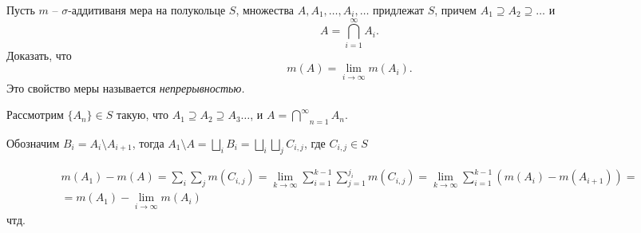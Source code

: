 \begin{task}{4}
Пусть $m$ -- $\sigma$-аддитиваня мера на полукольце $S$, множества $A, A_1, \ldots, A_i, \ldots$ придлежат $S$, причем $A_1 \supseteq A_2 \supseteq \ldots$ и
\[
A = \bigcap_{i = 1}^{\infty}A_i.
\]
Доказать, что
\[
m(A) = \lim\limits_{i \to \infty}m(A_i).
\]
Это свойство меры называется \textit{непрерывностью.}
\end{task}
\begin{solution}
Рассмотрим $\lbrace A_n \rbrace \in S$ такую,  что $A_1 \supseteq A_2 \supseteq A_3 \ldots$, и $A = \underset{n=1}{\overset{\infty}{\bigcap}} A_n$.

Обозначим $B_i = A_i \setminus A_{i+1}$, тогда $A_1 \setminus A = 
\bigsqcup\limits_i B_i = \bigsqcup\limits_i \bigsqcup\limits_j C_{i, j}$, где 
$C_{i, j} \in S$

\begin{gather*}
m(A_1) - m(A) = \sum_i \sum_j m(C_{i, j}) = 
\lim_{k \to \infty} \sum_{i=1}^{k-1} \sum_{j = 1}^{j_i} m(C_{i,j}) = \lim_{k 
\to \infty} \sum\limits_{i=1}^{k-1} \left( m(A_i) - m(A_{i+1}) \right) =\\ = 
m(A_1) - \underset{i \to \infty}{\lim} m(A_i)
\end{gather*}
чтд.
\end{solution}